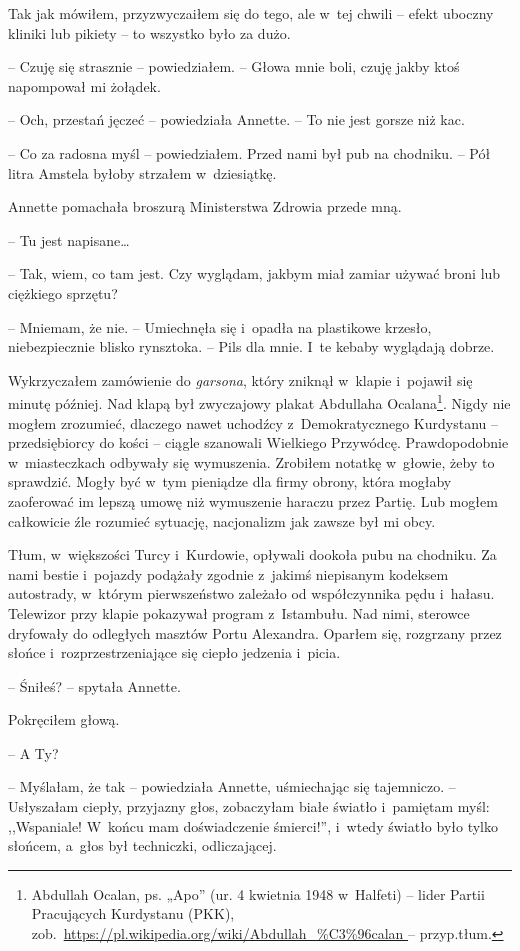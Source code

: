 \documentclass[oneside,polish,11pt,sfheadings]{mwbk}
\begin{document}
Tak jak mówiłem, przyzwyczaiłem się do tego, ale w~tej chwili -- efekt
uboczny kliniki lub pikiety -- to wszystko było za dużo.

-- Czuję się strasznie -- powiedziałem. -- Głowa mnie boli, czuję jakby
ktoś napompował mi żołądek.

-- Och, przestań jęczeć -- powiedziała Annette. -- To nie jest gorsze niż
kac.

-- Co za radosna myśl -- powiedziałem. Przed nami był pub na chodniku. -- Pół litra Amstela byłoby strzałem w~dziesiątkę.

Annette pomachała broszurą Ministerstwa Zdrowia przede mną. 

-- Tu jest napisane\ldots

-- Tak, wiem, co tam jest. Czy wyglądam, jakbym miał zamiar używać broni
lub ciężkiego sprzętu?

-- Mniemam, że nie. -- Umiechnęła się i~opadła na plastikowe krzesło,
niebezpiecznie blisko rynsztoka. -- Pils dla mnie. I~te kebaby wyglądają
dobrze.

Wykrzyczałem zamówienie do \emph{garsona}, który zniknął w~klapie i~pojawił się minutę później. Nad klapą był zwyczajowy plakat Abdullaha
Ocalana\footnote{Abdullah Ocalan, ps. „Apo'' (ur. 4 kwietnia 1948 w~Halfeti) -- lider Partii Pracujących Kurdystanu (PKK),
zob.~\url{https://pl.wikipedia.org/wiki/Abdullah_\%C3\%96calan
} -- przyp.tłum.}. Nigdy nie mogłem zrozumieć, dlaczego nawet uchodźcy z~Demokratycznego Kurdystanu -- przedsiębiorcy do kości -- ciągle szanowali
Wielkiego Przywódcę. Prawdopodobnie w~miasteczkach odbywały się
wymuszenia. Zrobiłem notatkę w~głowie, żeby to sprawdzić. Mogły być w~tym pieniądze dla firmy obrony, która mogłaby zaoferować im lepszą umowę
niż wymuszenie haraczu przez Partię. Lub mogłem całkowicie źle rozumieć
sytuację, nacjonalizm jak zawsze był mi obcy.

Tłum, w~większości Turcy i~Kurdowie, opływali dookoła pubu na chodniku.
Za nami bestie i~pojazdy podążały zgodnie z~jakimś niepisanym kodeksem
autostrady, w~którym pierwszeństwo zależało od współczynnika pędu i~hałasu. Telewizor przy klapie pokazywał program z~Istambułu. Nad nimi,
sterowce dryfowały do odległych masztów Portu Alexandra. Oparłem się,
rozgrzany przez słońce i~rozprzestrzeniające się ciepło jedzenia i~picia.

-- Śniłeś? -- spytała Annette.

Pokręciłem głową. 

-- A Ty?

-- Myślałam, że tak -- powiedziała Annette, uśmiechając się tajemniczo. -- Usłyszałam ciepły, przyjazny głos, zobaczyłam białe światło i~pamiętam
myśl: ,,Wspaniale! W~końcu mam doświadczenie śmierci!'', i~wtedy światło
było tylko słońcem, a~głos był techniczki, odliczającej.
\end{document}
